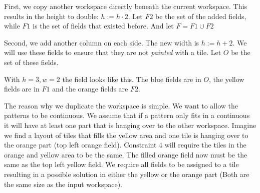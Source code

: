 \documentclass{../base/base}
\begin{document}
First, we copy another workspace directly beneath the current workspace. This results in the height to double: $h := h \cdot 2$.
Let $F2$ be the set of the added fields, while $F1$ is the set of fields that existed before. And let $F = F1 \cup F2$

Second, we add another column on each side. The new width is $h := h+2$. We will use these fields to ensure that they are not \textit{painted} with a tile. Let $O$ be the set of these fields.

With $h=3,w=2$ the field looks like this. The blue fields are in $O$, the yellow fields are in $F1$ and the orange fields are $F2$. \\

\begin{center}
\end{center}

The reason why we duplicate the workspace is simple. We want to allow the patterns to be continuous. We assume that if a pattern only fits in a continuous it will have at least one part that is hanging over to the other workspace. Imagine we find a layout of tiles that fills the yellow area and one tile is hanging over to the orange part (top left orange field).
Constraint 4 will require the tiles in the orange and yellow area to be the same. The filled orange field now must be the same as the top left yellow field. We require all fields to be assigned to a tile resulting in a possible solution in either the yellow or the orange part (Both are the same size as the input workspace).
\end{document}
